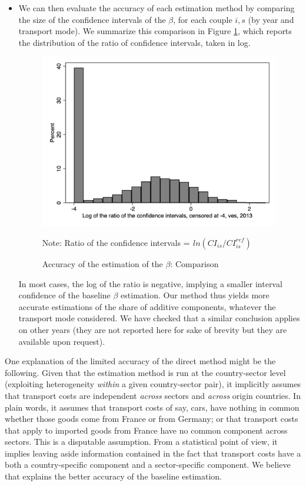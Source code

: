 \documentclass[a4paper,11pt]{article}
\begin{document}
\begin{itemize}
\begin{itemize}
    \item We can then evaluate the accuracy of each estimation method by comparing the size of the confidence intervals of the $\beta$, for each couple $i,s$ (by year and transport mode). We summarize this comparison in Figure \ref{fig:accuracy_beta}, which reports the distribution of the ratio of confidence intervals, taken in log.


    \begin{figure}[htbp]
    \caption{Accuracy of the estimation of the $\beta$: Comparison}
    \label{fig:accuracy_beta}
    \begin{center}
    \includegraphics[height=3in]{../../revised_article/comparaison_amplitude_baseline_referee1_2013_ves.png}
    \begin{minipage} [c]  {5in} \scriptsize%
    	    Note: Ratio of the confidence intervals = $ _{}ln(CI_{is}/CI^{ref}_{is})$
    \end{minipage}

    \end{center}
    \end{figure}

In most cases, the log of the ratio is negative, implying a smaller interval confidence of the baseline $\beta$ estimation. Our method thus yields more accurate estimations of the share of additive components, whatever the transport mode considered. We have checked that a similar conclusion applies on other years (they are not reported here for sake of brevity but they are available upon request).
    \end{itemize}

One explanation of the limited accuracy of the direct method might be the following. Given that the estimation method is run at the country-sector level (exploiting heterogeneity \textit{within} a given country-sector pair), it implicitly assumes that transport costs are independent \textit{across} sectors and \textit{across} origin countries. In plain words, it assumes that transport costs of say, cars, have nothing in common whether those goods come from France or from Germany; or that transport costs that apply to imported goods from France have no common component across sectors. This is a disputable assumption. From a statistical point of view, it implies leaving aside information contained in the fact that transport costs have a both a country-specific component and a sector-specific component. We believe that explains the better accuracy of the baseline estimation.



\end{itemize}
\end{document}
